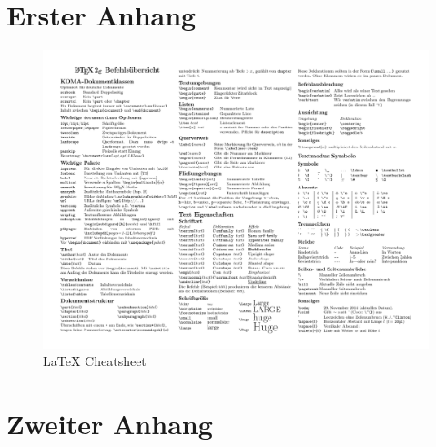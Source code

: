 \appendix
\chapter{Erster Anhang}
\begin{figure}[H]
	\includegraphics[width=\textwidth, keepaspectratio]{latexsheet-de}
	\caption*{\LaTeX{} Cheatsheet}
	\label{latexsheet}
\end{figure}

\chapter{Zweiter Anhang}
\blindtext